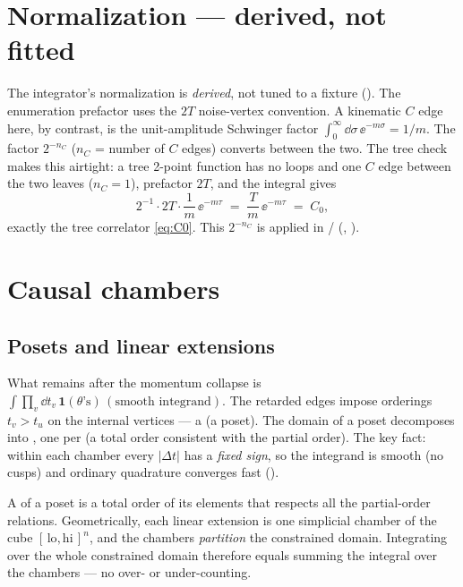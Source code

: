 \section{Normalization --- derived, not fitted}\label{sec:norm}

The integrator's normalization is \emph{derived}, not tuned to a fixture
(). The enumeration prefactor uses the $2T$
noise-vertex convention. A kinematic $C$ edge here, by contrast, is the
unit-amplitude Schwinger factor $\int_0^\infty\dd\sigma\,\ee^{-m\sigma}=1/m$. The
factor $2^{-n_C}$ ($n_C$ = number of $C$ edges) converts between the two. The
tree check makes this airtight: a tree 2-point function has no loops and one $C$
edge between the two leaves ($n_C=1$), prefactor $2T$, and the integral gives
\begin{equation}
  2^{-1}\cdot 2T\cdot\frac{1}{m}\,\ee^{-m\tau}
  \;=\; \frac{T}{m}\,\ee^{-m\tau}
  \;=\; C_0,
\end{equation}
exactly the tree correlator \eqref{eq:C0}. This $2^{-n_C}$ is applied in
 /  (,
).

\section{Causal chambers}\label{sec:chambers}

\subsection{Posets and linear extensions}

What remains after the momentum collapse is
$\int\prod_v\dd t_v\,\mathbf{1}(\theta\text{'s})\,(\text{smooth integrand})$. The
retarded edges impose orderings $t_v > t_u$ on the internal vertices --- a
 (a poset). The domain of a poset decomposes into
, one per  (a total order
consistent with the partial order). The key fact: within each chamber every
$|\Delta t|$ has a \emph{fixed sign}, so the integrand is smooth (no cusps) and
ordinary quadrature converges fast ().

\begin{defn}
A  of a poset is a total order of its elements that
respects all the partial-order relations. Geometrically, each linear extension is
one simplicial chamber of the cube $[\,\text{lo},\text{hi}\,]^{n}$, and the
chambers \emph{partition} the constrained domain. Integrating over the whole
constrained domain therefore equals summing the integral over the chambers --- no
over- or under-counting.
\end{defn}

